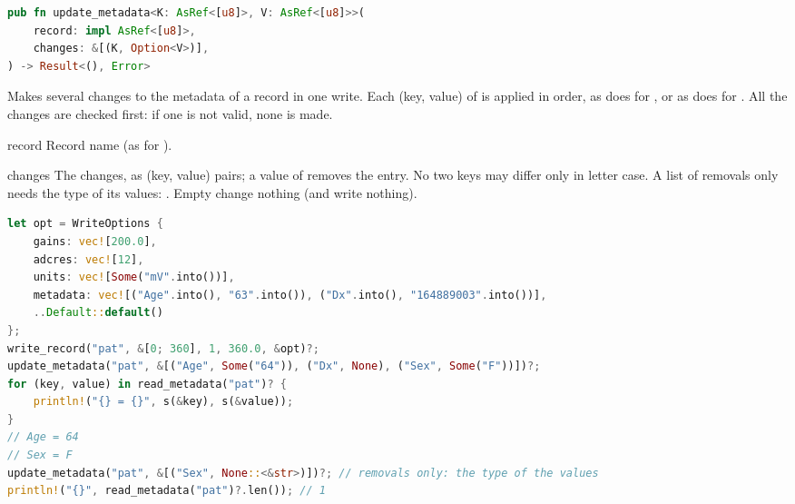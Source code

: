 \begin{lstlisting}[language=Rust,style=signature]
pub fn update_metadata<K: AsRef<[u8]>, V: AsRef<[u8]>>(
    record: impl AsRef<[u8]>,
    changes: &[(K, Option<V>)],
) -> Result<(), Error>
\end{lstlisting}
Makes several changes to the metadata of a record in one write. Each (key, value) of
 is applied in order, as  does for , or
as  does for . All the changes are checked first: if one
is not valid, none is made.
\begin{params}
\item[record] Record name (as for ).
\item[changes] The changes, as (key, value) pairs; a value of  removes the
  entry. No two keys may differ only in letter case. A list of removals only needs the
  type of its values: . Empty  change
  nothing (and write nothing).
\end{params}
\begin{lstlisting}[language=Rust,style=example]
let opt = WriteOptions {
    gains: vec![200.0],
    adcres: vec![12],
    units: vec![Some("mV".into())],
    metadata: vec![("Age".into(), "63".into()), ("Dx".into(), "164889003".into())],
    ..Default::default()
};
write_record("pat", &[0; 360], 1, 360.0, &opt)?;
update_metadata("pat", &[("Age", Some("64")), ("Dx", None), ("Sex", Some("F"))])?;
for (key, value) in read_metadata("pat")? {
    println!("{} = {}", s(&key), s(&value));
}
// Age = 64
// Sex = F
update_metadata("pat", &[("Sex", None::<&str>)])?; // removals only: the type of the values
println!("{}", read_metadata("pat")?.len()); // 1
\end{lstlisting}

